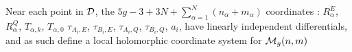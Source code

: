 \documentclass{article}
\begin{document}
\begin{theorem}
Near each point in $\mathcal{D}$, the $5g -3 + 3N + \sum_{\alpha=1}^N (n_\alpha + m_\alpha)$ coordinates : $R_\alpha^E$, $R_\alpha^Q$, $T_{\alpha,k}$, $T_{\alpha,0}$ $\tau_{A_i,E}$, $ \tau_{B_i,E}$, $\tau_{A_i,Q}$, $\tau_{B_i,Q}$, $a_i$, have linearly independent differentials, and as such define a local holomorphic coordinate system for $\mathcal{M}_g(n,m)$
\end{theorem}
%
%


\end{document}
